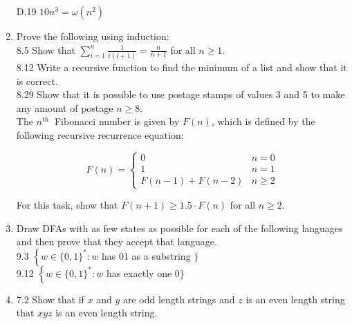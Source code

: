 \documentclass[10pt]{article}
\begin{document}
\begin{enumerate}[label={}]
          D.19 $10 n^3=\omega\left(n^2\right)$\\

    \item Prove the following using induction:\\

          8.5 Show that $\sum_{i=1}^n \frac{1}{i(i+1)}=\frac{n}{n+1}$ for all $n \geq 1$.\\

          8.12 Write a recursive function to find the minimum of a list and show that it is correct.\\

          8.29 Show that it is possible to use postage stamps of values 3 and 5 to make any amount of postage $n \geq 8$.\\


          The $n^{\text {th }}$ Fibonacci number is given by $F(n)$, which is defined by the following recursive recurrence equation:

          $$
              F(n)= \begin{cases}0 & n=0 \\ 1 & n=1 \\ F(n-1)+F(n-2) & n \geq 2\end{cases}
          $$


          For this task, show that $F(n+1) \geq 1.5 \cdot F(n)$ for all $n \geq 2$.\\


    \item Draw DFAs with as few states as possible for each of the following languages and then prove that they accept that language.\\

          9.3 $\left\{w \in\{0,1\}^*: w\right.$ has 01 as a substring $\}$\\

          9.12 $\left\{w \in\{0,1\}^*: w\right.$ has exactly one 0$\}$\\

          \newpage

    \item 7.2 Show that if $x$ and $y$ are odd length strings and $z$ is an even length string that $x y z$ is an even length string.


\end{enumerate}
\end{document}
